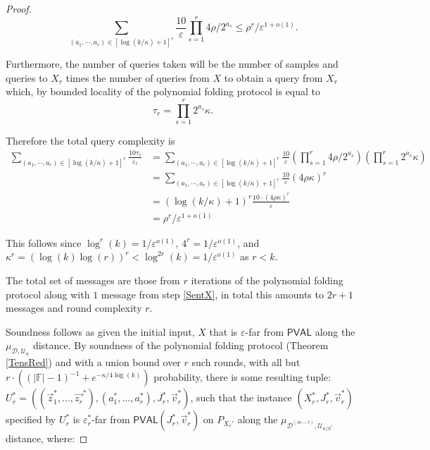 \documentclass[11pt]{article}
\newcommand{\PVAL}{\mathsf{PVAL}}
\begin{document}
\begin{proof}
\begin{equation*}
    \sum_{(a_{1},\cdots, a_{r})\in[\log(k/\kappa)+1]^{r}}\frac{10}{\varepsilon}\prod_{s=1}^{r}4\rho/2^{a_{s}} \leq \rho^{r}/\varepsilon^{1+o(1)}.
\end{equation*}

Furthermore, the number of queries taken will be the number of samples and queries to $X_{r}$ times the number of queries from $X$ to obtain a query from $X_{r}$ which, by bounded locality of the polynomial folding protocol is equal to 
\begin{equation*}
    \tau_{r}=\prod_{s=1}^{r}2^{a_{s}}\kappa.
\end{equation*}

Therefore the total query complexity is
\[
\begin{split}
    \sum_{(a_{1},\cdots, a_{r})\in [\log(k/\kappa)+1]^{r}}\frac{10\tau_{r}}{\varepsilon_{r}} &=\sum_{(a_{1},\cdots, a_{r})\in [\log(k/\kappa)+1]^{r}}\frac{10}{\varepsilon}\left(\prod_{s=1}^{r}4\rho/2^{a_{s}}\right)\left(\prod_{s=1}^{r}2^{a_{s}}\kappa\right)\\
    &=\sum_{(a_{1},\cdots, a_{r})\in [\log(k/\kappa)+1]^{r}}\frac{10}{\varepsilon}\left(4\rho\kappa\right)^{r}\\
    &=(\log (k/\kappa) +1)^{r}\frac{10\cdot (4\rho\kappa)^{r}}{\varepsilon}\\
    &=\rho^{r}/\varepsilon^{1+o(1)}
\end{split}
\]

This follows since $\log^{r}(k)=1/\varepsilon^{o(1)}$, $4^{r}=1/\varepsilon^{o(1)}$, and $\kappa^{r}=(\log (k)\log (r))^{r}<\log ^{2r}(k)=1/\varepsilon^{o(1)}$ as $r<k$.


The total set of messages are those from $r$ iterations of the polynomial folding protocol along with $1$ message from step \ref{SentX}, in total this amounts to $2r+1$ messages and round complexity $r$.

Soundness follows as given the initial input, $X$ that is $\varepsilon$-far from $\PVAL$ along the $\mu_{\mathcal{D},\mathcal{U}_{n}}$ distance. By soundness of the polynomial folding protocol (Theorem \ref{TensRed}) and with a union bound over $r$ such rounds, with all but $r\cdot((\vert \mathbb{F}\vert -1)^{-1}+e^{-\kappa/4\log (k)})$ probability, there is some resulting tuple: $U_{r}^{\ast}=((\vec{z}_{1}^{\ast}, . . . , \vec{z_{r}}^{\ast}),(a_{1}^{\ast}, . . . , a_{r}^{\ast}), J_{r}^{\ast}, \vec{v}_{r}^{\ast})$, such that the instance $(X_{r}^{\ast}, J_{r}^{\ast}, \vec{v}_{r}^{\ast})$ specified by $U_{r}^{\ast}$ is $\varepsilon_{r}^{\ast}$-far from $\PVAL(J_{r}^{\ast},\Vec{v}_{r}^{\ast})$ on $P_{X_{r}'}$ along the $\mu_{\mathcal{D}^{(m-r)},\mathcal{U}_{n/k^{r}}}$ distance, where:


\end{proof}
\end{document}

